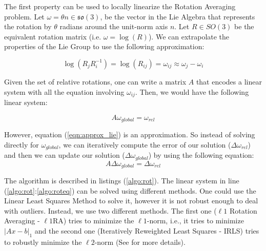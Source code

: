 \documentclass[conference, 12pt]{acmsiggraph}
\begin{document}
The first property can be used to locally linearize the Rotation Averaging problem. Let $\omega = \theta n \in \mathfrak{so}(3)$, be the vector in the Lie Algebra that represents the rotation by $\theta$ radians around the unit-norm axis $n$. Let $R \in SO(3)$ be the equivalent rotation matrix (i.e. $\omega = \log(R)$). We can extrapolate the properties of the Lie Group to use the following approximation: 

\begin{equation}
\log(R_{j}R_{i}^{-1}) = \log(R_{ij}) = \omega_{ij} \approx \omega_{j} - \omega_{i}
\label{eqn:approx_lie}
\end{equation}

Given the set of relative rotations, one can write a matrix $A$ that encodes a linear system with all the equation involving $\omega_{ij}$. Then, we would have the following linear system:

\begin{equation}
A\omega_{global} = \omega_{rel}
\end{equation}

However, equation (\ref{eqn:approx_lie}) is an approximation. So instead of solving directly for $\omega_{global}$, we can iteratively compute the error of our solution ($\Delta\omega_{rel}$) and then we can update our solution ($\Delta\omega_{global}$) by using the following equation:
\begin{equation}
A\Delta\omega_{global} = \Delta\omega_{rel}
\end{equation}

The algorithm is described in listings (\ref{algo:rot}). The linear system in line (\ref{algo:rot}:\ref{algo:roteq}) can be solved using different methods. One could use the Linear Least Squares Method to solve it, however it is not robust enough to deal with outliers. Instead, we use two different methods. The first one ($\ell1$ Rotation Averaging - $\ell1$RA) tries to minimize the $\ell1$-norm, i.e., it tries to minimize $|Ax - b|_1$ and the second one (Iteratively Reweighted Least Squares - IRLS) tries to robustly minimize the $\ell2$-norm (See \cite{rotation} for more details).
\end{document}
